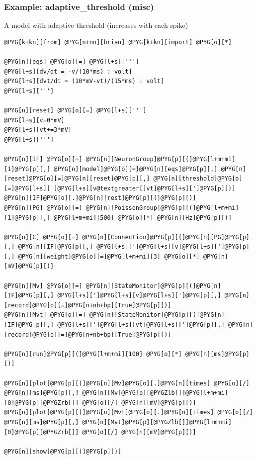 \documentclass[letterpaper,10pt,english]{manual}
\begin{document}
\resetcurrentobjects
\hypertarget{--doc-examples-misc_adaptive_threshold}{}

\hypertarget{index-42}{}\subsubsection{Example: adaptive\_threshold (misc)}

A model with adaptive threshold (increases with each spike)

\begin{Verbatim}[commandchars=@\[\]]
@PYG[k+kn][from] @PYG[n+nn][brian] @PYG[k+kn][import] @PYG[o][*]

@PYG[n][eqs] @PYG[o][=] @PYG[l+s][''']
@PYG[l+s][dv/dt = -v/(10*ms) : volt]
@PYG[l+s][dvt/dt = (10*mV-vt)/(15*ms) : volt]
@PYG[l+s][''']

@PYG[n][reset] @PYG[o][=] @PYG[l+s][''']
@PYG[l+s][v=0*mV]
@PYG[l+s][vt+=3*mV]
@PYG[l+s][''']

@PYG[n][IF] @PYG[o][=] @PYG[n][NeuronGroup]@PYG[p][(]@PYG[l+m+mi][1]@PYG[p][,] @PYG[n][model]@PYG[o][=]@PYG[n][eqs]@PYG[p][,] @PYG[n][reset]@PYG[o][=]@PYG[n][reset]@PYG[p][,] @PYG[n][threshold]@PYG[o][=]@PYG[l+s][']@PYG[l+s][v@textgreater[]vt]@PYG[l+s][']@PYG[p][)]
@PYG[n][IF]@PYG[o][.]@PYG[n][rest]@PYG[p][(]@PYG[p][)]
@PYG[n][PG] @PYG[o][=] @PYG[n][PoissonGroup]@PYG[p][(]@PYG[l+m+mi][1]@PYG[p][,] @PYG[l+m+mi][500] @PYG[o][*] @PYG[n][Hz]@PYG[p][)]

@PYG[n][C] @PYG[o][=] @PYG[n][Connection]@PYG[p][(]@PYG[n][PG]@PYG[p][,] @PYG[n][IF]@PYG[p][,] @PYG[l+s][']@PYG[l+s][v]@PYG[l+s][']@PYG[p][,] @PYG[n][weight]@PYG[o][=]@PYG[l+m+mi][3] @PYG[o][*] @PYG[n][mV]@PYG[p][)]

@PYG[n][Mv] @PYG[o][=] @PYG[n][StateMonitor]@PYG[p][(]@PYG[n][IF]@PYG[p][,] @PYG[l+s][']@PYG[l+s][v]@PYG[l+s][']@PYG[p][,] @PYG[n][record]@PYG[o][=]@PYG[n+nb+bp][True]@PYG[p][)]
@PYG[n][Mvt] @PYG[o][=] @PYG[n][StateMonitor]@PYG[p][(]@PYG[n][IF]@PYG[p][,] @PYG[l+s][']@PYG[l+s][vt]@PYG[l+s][']@PYG[p][,] @PYG[n][record]@PYG[o][=]@PYG[n+nb+bp][True]@PYG[p][)]

@PYG[n][run]@PYG[p][(]@PYG[l+m+mi][100] @PYG[o][*] @PYG[n][ms]@PYG[p][)]

@PYG[n][plot]@PYG[p][(]@PYG[n][Mv]@PYG[o][.]@PYG[n][times] @PYG[o][/] @PYG[n][ms]@PYG[p][,] @PYG[n][Mv]@PYG[p][@PYGZlb[]]@PYG[l+m+mi][0]@PYG[p][@PYGZrb[]] @PYG[o][/] @PYG[n][mV]@PYG[p][)]
@PYG[n][plot]@PYG[p][(]@PYG[n][Mvt]@PYG[o][.]@PYG[n][times] @PYG[o][/] @PYG[n][ms]@PYG[p][,] @PYG[n][Mvt]@PYG[p][@PYGZlb[]]@PYG[l+m+mi][0]@PYG[p][@PYGZrb[]] @PYG[o][/] @PYG[n][mV]@PYG[p][)]

@PYG[n][show]@PYG[p][(]@PYG[p][)]
\end{Verbatim}
\end{document}

